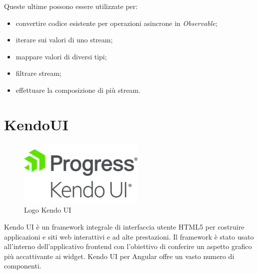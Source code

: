 Queste ultime possono essere utilizzate per:
\begin{itemize}
    \item convertire codice esistente per operazioni asincrone in \textit{Observable};
    \item iterare sui valori di uno stream;
    \item mappare valori di diversi tipi;
    \item filtrare stream;
    \item effettuare la composizione di più stream.
\end{itemize}

\section{KendoUI}
\begin{figure}[ht!]
\begin{center}
  \includegraphics[width=6cm]{images/kendo_logo.png}
  \caption{Logo Kendo UI}
\end{center}
\end{figure}
Kendo UI è un framework integrale di interfaccia utente HTML5 per costruire applicazioni e siti web interattivi e ad alte prestazioni. \cite{KENDO}
Il framework è stato usato all'interno dell'applicativo frontend con l'obiettivo di conferire un aspetto grafico più accattivante ai widget. Kendo UI per Angular offre un vasto numero di componenti.

